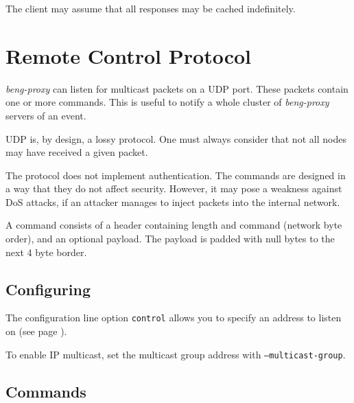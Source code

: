 \documentclass[a4paper,12pt]{article}
\begin{document}
The client may assume that all responses may be cached indefinitely.


\section{Remote Control Protocol}
\label{control}

\emph{beng-proxy} can listen for multicast packets on a UDP port.
These packets contain one or more commands.  This is useful to notify
a whole cluster of \emph{beng-proxy} servers of an event.

UDP is, by design, a lossy protocol.  One must always consider that
not all nodes may have received a given packet.

The protocol does not implement authentication.  The commands are
designed in a way that they do not affect security.  However, it may
pose a weakness against DoS attacks, if an attacker manages to inject
packets into the internal network.

A command consists of a header containing length and command (network
byte order), and an optional payload.  The payload is padded with null
bytes to the next 4 byte border.

\subsection{Configuring}

The configuration line option \verb|control| allows you to specify an
address to listen on (see page \pageref{config.control}).

To enable IP multicast, set the multicast group address with
\texttt{--multicast-group}.

\subsection{Commands}
\end{document}
